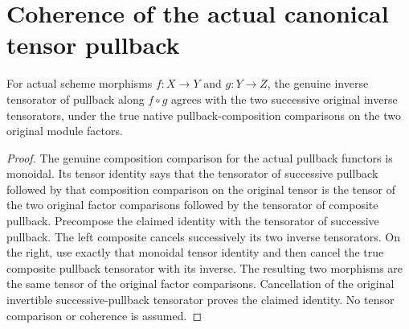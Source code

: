 \section{Coherence of the actual canonical tensor pullback}

\begin{lemma}
\label{lem:cartier-actual-pullback-inverse-tensorator-composition}
\leanok
For actual scheme morphisms $f:X\to Y$ and $g:Y\to Z$, the genuine
inverse tensorator of pullback along $f\circ g$ agrees with the two
successive original inverse tensorators, under the true native
pullback-composition comparisons on the two original module factors.
\end{lemma}
\begin{proof}
The genuine composition comparison for the actual pullback functors
is monoidal. Its tensor identity says that the tensorator of successive
pullback followed by that composition comparison on the original tensor
is the tensor of the two original factor comparisons followed by the
tensorator of composite pullback. Precompose the claimed identity with
the tensorator of successive pullback. The left composite cancels
successively its two inverse tensorators. On the right, use exactly
that monoidal tensor identity and then cancel the true composite
pullback tensorator with its inverse. The resulting two morphisms are
the same tensor of the original factor comparisons. Cancellation of
the original invertible successive-pullback tensorator proves the
claimed identity. No tensor comparison or coherence is assumed.
\end{proof}
